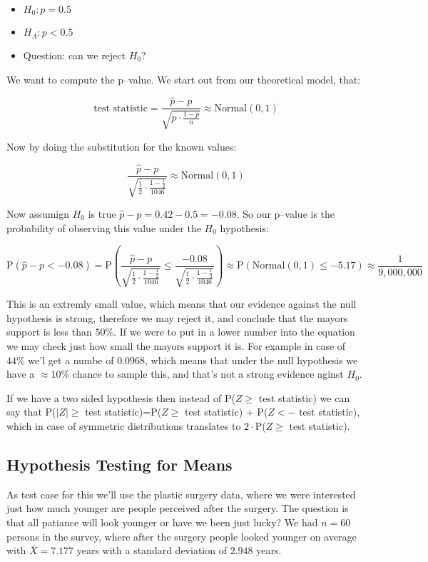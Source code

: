 \begin{itemize}
  \item $H_0: p = 0.5$
  \item $H_A: p < 0.5$
  \item Question: can we reject $H_0$?
\end{itemize}

We want to compute the p--value. We start out from our theoretical model, that:

\[ \mbox{test statistic} = \frac{\hat{p}-p}{\sqrt{p\cdot\frac{1-p}{n}}} \approx
\mbox{Normal}(0,1)
\]

Now by doing the substitution for the known values:

\[ \frac{\hat{p}-p}{\sqrt{\frac{1}{2}\cdot\frac{1-\frac{1}{2}}{1046}}} \approx
\mbox{Normal}(0,1)
\]
 
Now assumign $H_0$ is true $\hat{p}-p=0.42-0.5=-0.08$. So our p--value is the
probability of observing this value under the $H_0$ hypothesis:

\[ \mbox{P}(\hat{p}-p < -0.08) = \mbox{P} \left(
\frac{\hat{p}-p}{\sqrt{\frac{1}{2}\cdot\frac{1-\frac{1}{2}}{1046}}} \leq 
\frac{-0.08}{\sqrt{\frac{1}{2}\cdot\frac{1-\frac{1}{2}}{1046}}} \right)
\approx \mbox{P}\left( \mbox{Normal} \left( 0,1\right) \leq -5.17 \right)
\approx \frac{1}{9,000,000}
\]

This is an extremly small value, which means that our evidence against the null
hypothesis is strong, therefore we may reject it, and conclude that the mayors
support is less than $50\%$. If we were to put in a lower number into the
equation we may check just how small the mayors support it is. For example in
case of $44\%$ we'l get a numbe of $0.0968$, which means that under the null
hypothesis we have a $\approx 10\%$ chance to sample this, and that's not a
strong evidence aginst $H_0$.

If we have a two sided hypothesis then instead of P($Z \geq$  test statistic) we
can say that P($|Z| \geq$  test statistic)=P($Z \geq$  test statistic) $+$
P($Z <-$  test statistic), which in case of symmetric distributions
translates to $2\cdot$P($Z \geq$  test statistic).

\subsection{Hypothesis Testing for Means}

As test case for this we'll use the plastic surgery data, where we were
interested just how much younger are people perceived after the surgery. The
question is that all patiance will look younger or have we been just lucky? We
had $n=60$ persons in the survey, where after the surgery people looked younger
on average with $\bar{X}=7.177$ years with a standard deviation of $2.948$
years.

